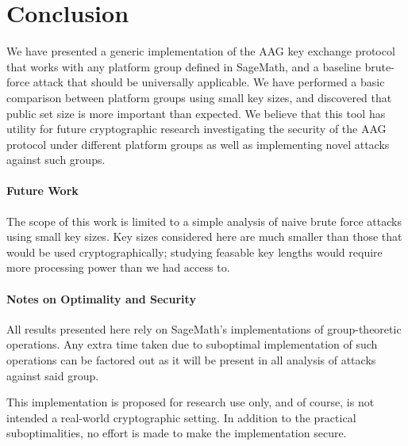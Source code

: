 \section{Conclusion}
\label{sec:conclusion}

We have presented a generic implementation of the AAG key exchange protocol that works with any platform group defined in SageMath, and a baseline brute-force attack that should be universally applicable. We have performed a basic comparison between platform groups using small key sizes, and discovered that public set size is more important than expected. We believe that this tool has utility for future cryptographic research investigating the security of the AAG protocol under different platform groups as well as implementing novel attacks against such groups.

\paragraph{Future Work} 

The scope of this work is limited to a simple analysis of naive brute force attacks using small key sizes. Key sizes considered here are much smaller than those that would be used cryptographically; studying feasable key lengths would require more processing power than we had access to.

\paragraph{Notes on Optimality and Security} All results presented here rely on SageMath's implementations of group-theoretic operations. Any extra time taken due to suboptimal implementation of such operations can be factored out as it will be present in all analysis of attacks against said group.

This implementation is proposed for research use only, and of course, is not intended a real-world cryptographic setting. In addition to the practical suboptimalities, no effort is made to make the implementation secure. 
